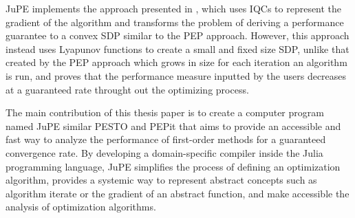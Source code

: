 JuPE implements the approach presented in \cite{tutorial}, which uses IQCs to represent the gradient of the algorithm and transforms the problem of deriving a performance guarantee to a convex SDP similar to the PEP approach. However, this approach instead uses Lyapunov functions to create a small and fixed size SDP, unlike that created by the PEP approach which grows in size for each iteration an algorithm is run, and proves that the performance measure inputted by the users decreases at a guaranteed rate throught out the optimizing process.

The main contribution of this thesis paper is to create a computer program named JuPE similar PESTO and PEPit that aims to provide an accessible and fast way to analyze the performance of first-order methods for a guaranteed convergence rate. By developing a domain-specific compiler inside the Julia programming language, JuPE simplifies the process of defining an optimization algorithm, provides a systemic way to represent abstract concepts such as algorithm iterate or the gradient of an abstract function, and make accessible the analysis of optimization algorithms. 